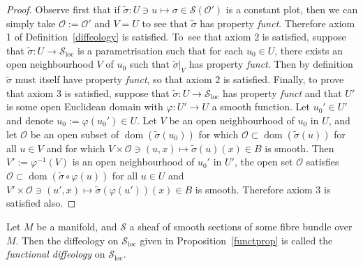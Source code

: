 \documentclass[pdftex]{sigma}
\numberwithin{equation}{section}
\def\loc{\operatorname{loc}}
\def\dom{\operatorname{dom}}
\def\OO{{\mathcal{O}}}
\def\SS{{\mathscr{S}}}
\begin{document}
\begin{proof}
Observe first that if $\tilde{\sigma}\colon U\ni u\mapsto \sigma\in \SS(\mathcal{O}')$ is a constant plot, then we can simply take $\OO:=\OO'$ and $V = U$ to see that $\tilde{\sigma}$ has property \textit{funct}. Therefore axiom 1 of Definition~\ref{diffeology} is satisfied. To~see that axiom 2 is satisfied, suppose that $\tilde{\sigma}\colon U\rightarrow\SS_{\loc}$ is a parametrisation such that for each $u_{0}\in U$, there exists an open neighbourhood $V$ of $u_{0}$ such that $\tilde{\sigma}|_{V}$ has property \textit{funct}. Then by definition $\tilde{\sigma}$ must itself have property \textit{funct}, so that axiom 2 is satisfied. Finally, to prove that axiom 3 is satisfied, suppose that $\tilde{\sigma}\colon U\rightarrow\SS_{\loc}$ has property \textit{funct} and that $U'$ is some open Euclidean domain with $\varphi\colon U'\rightarrow U$ a smooth function. Let $u_{0}'\in U'$ and denote $u_{0}:=\varphi(u_{0}')\in U$. Let $V$ be an open neighbourhood of $u_{0}$ in $U$, and let $\OO$ be an open subset of $\dom(\tilde{\sigma}(u_{0}))$ for which $\OO\subset\dom(\tilde{\sigma}(u))$ for all $u\in V$ and for which $V\times\OO\ni(u,x)\mapsto\tilde{\sigma}(u)(x)\in B$ is smooth. Then $V':=\varphi^{-1}(V)$ is an open neighbourhood of $u_{0}'$ in $U'$, the open set $\OO$ satisfies $\OO\subset\dom(\tilde{\sigma}\circ\varphi(u))$ for all $u\in U$ and $V'\times\OO\ni(u',x)\mapsto\tilde{\sigma}(\varphi(u'))(x)\in B$ is smooth. Therefore axiom 3 is satisfied also.
\end{proof}

\begin{Definition}\label{funl}
Let $M$ be a manifold, and $\SS$ a sheaf of smooth sections of some fibre bundle over $M$. Then the diffeology on $\SS_{\loc}$ given in Proposition~\ref{functprop} is called the \textit{functional diffeology} on $\SS_{\loc}$.
\end{Definition}
\end{document}
